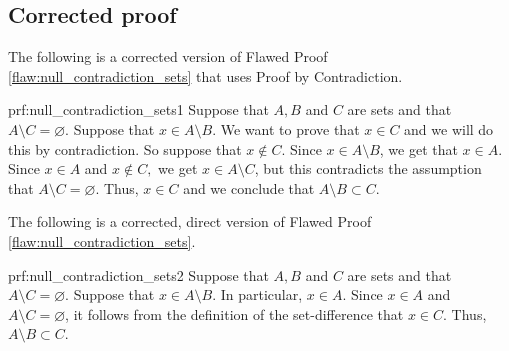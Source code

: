 \clearpage
\subsection{Corrected proof}

The following is a corrected version of Flawed Proof \ref{flaw:null_contradiction_sets} that uses Proof by Contradiction.

\begin{prf}{prf:null_contradiction_sets1} 
Suppose that $A,B$ and $C$ are sets and that $A \setminus C = \varnothing.$ Suppose that $x \in A \setminus B.$ We want to prove that $x \in C$ and we will do this by contradiction. So suppose that $x \notin C.$ Since $x \in A \setminus B$, we get that $x \in A.$ Since $x \in A$ and $x \notin C,$ we get $x \in A \setminus C$, but this contradicts the assumption that $A \setminus C = \varnothing$. Thus, $x \in C$ and we conclude that $A\setminus B \subset C$. 
\end{prf}

The following is a corrected, direct version of Flawed Proof \ref{flaw:null_contradiction_sets}.

\begin{prf}{prf:null_contradiction_sets2} 
Suppose that $A,B$ and $C$ are sets and that $A \setminus C = \varnothing.$ Suppose that $x \in A \setminus B.$ In particular, $x \in A$.  Since $x \in A$ and $A \setminus C = \varnothing$, it follows from the definition of the set-difference that $x \in C$.  Thus, $A\setminus B \subset C$.
\end{prf}